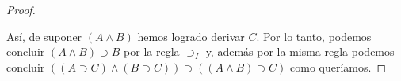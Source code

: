\documentclass{article}
\begin{document}
\begin{example}
\begin{proof}
        \begin{prooftree}
        \end{prooftree}
        
        Así, de suponer $(A \land B)$ hemos logrado derivar $C$. 
        Por lo tanto, podemos concluir $(A \land B) \supset B$
        por la regla $\supset_I$ y, además por la misma regla podemos concluir 
        $((A \supset C) \land (B \supset C)) \supset ((A \land B) \supset C)$ como queríamos.
    \end{proof}
\end{example}
\end{document}
